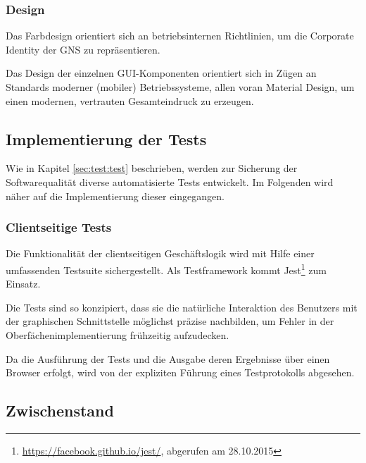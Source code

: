 \documentclass[12pt, xcolor=dvipsnames]{scrartcl}
\begin{document}
\subsubsection*{Design}

Das Farbdesign orientiert sich an betriebsinternen Richtlinien, um die Corporate Identity der GNS zu repräsentieren.

Das Design der einzelnen GUI-Komponenten orientiert sich in Zügen an Standards moderner (mobiler) Betriebssysteme, allen voran Material Design, um einen modernen, vertrauten Gesamteindruck zu erzeugen.

\subsection{Implementierung der Tests}

Wie in Kapitel \ref{sec:test:test} beschrieben, werden zur Sicherung der Softwarequalität diverse automatisierte Tests entwickelt. Im Folgenden wird näher auf die Implementierung dieser eingegangen.


\subsubsection*{Clientseitige Tests}

Die Funktionalität der clientseitigen Geschäftslogik wird mit Hilfe einer umfassenden Testsuite sichergestellt. Als Testframework kommt
Jest\footnote{\url{https://facebook.github.io/jest/}, abgerufen am 28.10.2015}
zum Einsatz.

Die Tests sind so konzipiert, dass sie die natürliche Interaktion des Benutzers mit der graphischen Schnittstelle möglichst präzise nachbilden, um Fehler in der Oberfächenimplementierung frühzeitig aufzudecken.

Da die Ausführung der Tests und die Ausgabe deren Ergebnisse über einen Browser erfolgt, wird von der expliziten Führung eines Testprotokolls abgesehen.

\subsection{Zwischenstand}
\end{document}
